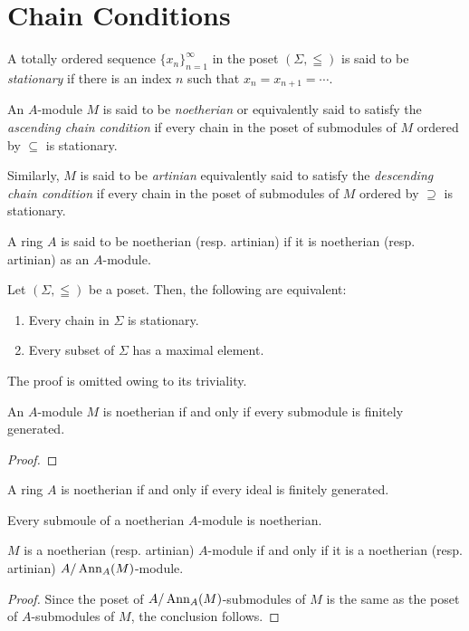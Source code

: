 \section{Chain Conditions}

A totally ordered sequence $\{x_n\}_{n = 1}^\infty$ in the poset $(\Sigma,\leqq)$ is said to be \textit{stationary} if there is an index $n$ such that $x_n = x_{n + 1} = \cdots$.

\begin{definition}
    An $A$-module $M$ is said to be \textit{noetherian} or equivalently said to satisfy the \textit{ascending chain condition} if every chain in the poset of submodules of $M$ ordered by $\subseteq$ is stationary.

    Similarly, $M$ is said to be \textit{artinian} equivalently said to satisfy the \textit{descending chain condition} if every chain in the poset of submodules of $M$ ordered by $\supseteq$ is stationary.
\end{definition}

A ring $A$ is said to be noetherian (resp. artinian) if it is noetherian (resp. artinian) as an $A$-module.

\begin{proposition}
    Let $(\Sigma,\leqq)$ be a poset. Then, the following are equivalent: 
    \begin{enumerate}[label=(\alph*)]
        \item Every chain in $\Sigma$ is stationary.
        \item Every subset of $\Sigma$ has a maximal element.
    \end{enumerate}
\end{proposition}
The proof is omitted owing to its triviality.

\begin{lemma}
    An $A$-module $M$ is noetherian if and only if every submodule is finitely generated.
\end{lemma}
\begin{proof}
    
\end{proof}
\begin{corollary}
    A ring $A$ is noetherian if and only if every ideal is finitely generated.
\end{corollary}
\begin{corollary}
    Every submoule of a noetherian $A$-module is noetherian.
\end{corollary}

\begin{proposition}
    $M$ is a noetherian (resp. artinian) $A$-module if and only if it is a noetherian (resp. artinian) $A/\operatorname{Ann}_A(M)$-module.
\end{proposition}
\begin{proof}
    Since the poset of $A/\operatorname{Ann}_A(M)$-submodules of $M$ is the same as the poset of $A$-submodules of $M$, the conclusion follows.
\end{proof}

